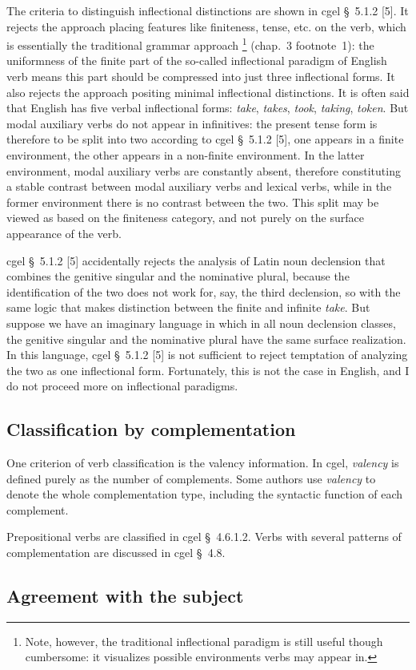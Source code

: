 \documentclass{article}
\newcommand*{\citesec}[1]{\S~{#1}}
\newcommand*{\citechap}[1]{chap.~{#1}}
\newcommand*{\citefootnote}[1]{footnote~{#1}}
\newcommand*{\term}[1]{\emph{#1}}
\newcommand*{\corpus}[1]{\emph{#1}}
\begin{document}
The criteria to distinguish inflectional distinctions are shown in \ac{cgel} \citesec{5.1.2} [5].
It rejects the approach placing features like finiteness, tense, etc. on the verb,
which is essentially the traditional grammar approach%
\footnote{
    Note, however, the traditional inflectional paradigm is still useful though cumbersome:
    it visualizes possible environments verbs may appear in.
} (\citechap{3} \citefootnote{1}):
the uniformness of the finite part of the so-called inflectional paradigm of English verb
means this part should be compressed into just three inflectional forms.
It also rejects the approach positing minimal inflectional distinctions.
It is often said that English has five verbal inflectional forms:
\corpus{take}, \corpus{takes}, \corpus{took}, \corpus{taking}, \corpus{token}. 
But modal auxiliary verbs do not appear in infinitives:
the present tense form is therefore to be split into two
according to \ac{cgel} \citesec{5.1.2} [5],
one appears in a finite environment,
the other appears in a non-finite environment.
In the latter environment, modal auxiliary verbs are constantly absent,
therefore constituting a stable contrast between modal auxiliary verbs and lexical verbs,
while in the former environment there is no contrast between the two.
This split may be viewed as based on the finiteness category,
and not purely on the surface appearance of the verb.

\ac{cgel} \citesec{5.1.2} [5] accidentally rejects the analysis of Latin noun declension
that combines the genitive singular and the nominative plural,
because the identification of the two does not work for, say, the third declension,
so with the same logic that makes distinction between the finite and infinite \corpus{take}.
But suppose we have an imaginary language in which in all noun declension classes,
the genitive singular and the nominative plural have the same surface realization.
In this language, \ac{cgel} \citesec{5.1.2} [5] is not sufficient 
to reject temptation of analyzing the two as one inflectional form.
Fortunately, this is not the case in English, and I do not proceed more on 
inflectional paradigms.

\subsection{Classification by complementation}

One criterion of verb classification is the valency information.
In \ac{cgel}, \term{valency} is defined purely as the number of complements.
Some authors use \term{valency} to denote the whole complementation type,
including the syntactic function of each complement.

Prepositional verbs are classified in \ac{cgel} \citesec{4.6.1.2}.
Verbs with several patterns of complementation are discussed in \ac{cgel} \citesec{4.8}.

\subsection{Agreement with the subject}\label{sec:verb-agreement}




\end{document}
